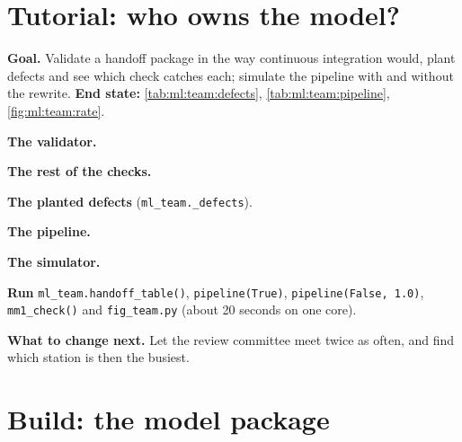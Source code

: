 \section{Tutorial: who owns the model?}\label{tut:ml:the-machine-learning-team:tut}

\begin{tutorial}
\textbf{Goal.} Validate a handoff package in the way continuous integration would, plant defects and see which check catches each;
simulate the pipeline with and without the rewrite. \textbf{End state:} \cref{tab:ml:team:defects}, \cref{tab:ml:team:pipeline},
\cref{fig:ml:team:rate}.
\begin{tutsteps}
\item \textbf{The validator.}
\label{lst:ml:team:validate}
\item \textbf{The rest of the checks.}
\label{lst:ml:team:checks}
\item \textbf{The planted defects} (\texttt{ml\_team.\_defects}).
\label{lst:ml:team:defects}
\item \textbf{The pipeline.}
\label{lst:ml:team:stations}
\item \textbf{The simulator.}
\label{lst:ml:team:sim}
\item \textbf{Run} \texttt{ml\_team.handoff\_table()}, \texttt{pipeline(True)}, \texttt{pipeline(False, 1.0)},
\texttt{mm1\_check()} and \texttt{fig\_team.py} (about 20 seconds on one core).
\end{tutsteps}
\textbf{What to change next.} Let the review committee meet twice as often, and find which station is then the busiest.
\end{tutorial}

\section{Build: the model package}\label{bld:ml:the-machine-learning-team:modelpkg}

